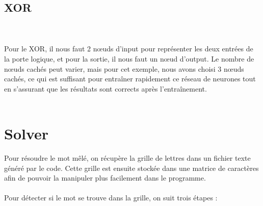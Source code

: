 \documentclass{article}
\begin{document}
\subsection{XOR}
\\\\

Pour le XOR, il nous faut 2 nœuds d'input pour représenter les deux entrées de la porte logique, et pour la sortie, il nous faut un nœud d'output. Le nombre de nœuds cachés peut varier, mais pour cet exemple, nous avons choisi 3 nœuds cachés, ce qui est suffisant pour entraîner rapidement ce réseau de neurones tout en s'assurant que les résultats sont corrects après l'entraînement.
\\\\

\section{Solver}
Pour résoudre le mot mêlé, on récupère la grille de lettres dans un fichier texte généré par le code. Cette grille est ensuite stockée dans une matrice de caractères afin de pouvoir la manipuler plus facilement dans le programme.
\\\\
Pour détecter si le mot se trouve dans la grille, on suit trois étapes :
\end{document}

